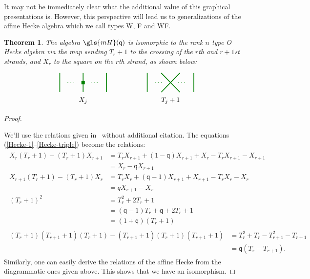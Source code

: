 \documentclass[10pt]{article}
\newtheorem{theorem}{Theorem}[section]
\theoremstyle{definition}
\newcommand{\newseq}{%
~\refstepcounter{equation}%
}
\newcommand{\pq}{\mathsf{q}}
\begin{document}
It may not be immediately clear what the additional value of this graphical
presentations is. However, this perspective
will lead us to generalizations of the affine Hecke algebra which we
call types W, F and WF.
 \begin{theorem}\label{type-O-Hecke}
The algebra $\gls{mH}(\pq)$ is isomorphic to the rank $n$ type O Hecke
algebra via the map sending $T_r+1$ to the crossing of the $r$th and
$r+1$st strands, and $X_r$ to the square on the $r$th strand, as shown below:
 \begin{equation}\label{Hecke-gens}
 \tikz[baseline]{
 \node[label=below:{$X_j$}] at (0,0){ 
 \tikz[very thick,xscale=1.2,green!50!black]{
 \draw (-.5,-.5)-- (-.5,.5);
 \draw (.5,-.5)-- (.5,.5) node [midway,fill=green!50!black,inner
 sep=2.5pt]{};
 \draw (1.5,-.5)-- (1.5,.5);
 \node at (1,0){$\cdots$};
 \node at (0,0){$\cdots$};
 }
 };
 \node[label=below:{$T_j+1$}] at (4.5,0){ 
 \tikz[very thick,xscale=1.2, green!50!black]{
 \draw (-.5,-.5)-- (-.5,.5);
 \draw (.1,-.5)-- (.9,.5);
 \draw (.9,-.5)-- (.1,.5);
 \draw (1.5,-.5)-- (1.5,.5);
 \node at (1,0){$\cdots$};
 \node at (0,0){$\cdots$};
 }
 };
 }\vspace{-2mm}
 \end{equation}
 \end{theorem}
 \begin{proof}
\newseq
 We'll use the relations given in~\cite[\S~4]{BKKL} without
 additional citation. The
 equations (\ref{Hecke-1}--\ref{Hecke-triple}) become the relations: 
\begin{gather*}
 \begin{aligned}
 X_r(T_r+1)-(T_r+1)X_{r+1}
 &=T_rX_{r+1}+(1-\pq)X_{r+1}+X_r-T_rX_{r+1}-X_{r+1} \\ 
 &=X_r-\pq X_{r+1}\\
 X_{r+1}(T_r+1)-(T_r+1)X_{r}
 &=T_rX_{r}+(\pq-1)X_{r+1}+X_{r+1}-T_rX_{r}-X_{r}\\
 &=qX_{r+1}-X_r\\
 (T_r+1)^2&=T_r^2+2T_r+1\\
&=(\pq-1)T_r+\pq+2T_r+1\\
&=(1+\pq)(T_r+1)
 \end{aligned}
 \\
 \begin{aligned}
 (T_r+1)(T_{r+1}+1)(T_r+1)-(T_{r+1}+1)(T_{r}+1)(T_{r+1}+1)&=
 T_r^2+T_r-T_{r+1}^2 -T_{r+1}\\
 &=\pq(T_r-T_{r+1}).
 \end{aligned}
 \end{gather*}
Similarly, one can easily derive the relations of the affine Hecke
from the diagrammatic ones given above. This shows that we have an
isomorphism.
 \end{proof}
\end{document}
